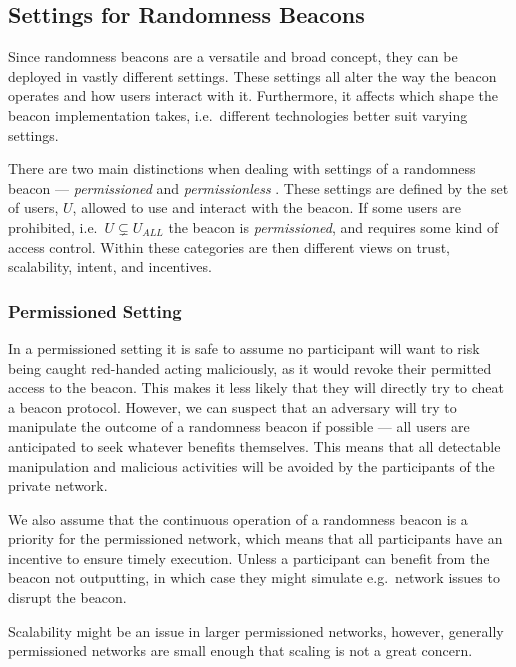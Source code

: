 \subsection{Settings for Randomness Beacons}
Since randomness beacons are a versatile and broad concept, they can be deployed in vastly different settings.
These settings all alter the way the beacon operates and how users interact with it.
Furthermore, it affects which shape the beacon implementation takes, i.e.\ different technologies better suit varying settings.

There are two main distinctions when dealing with settings of a randomness beacon --- \emph{permissioned} and \emph{permissionless} .
These settings are defined by the set of users, $U$, allowed to use and interact with the beacon.
If some users are prohibited, i.e.\ $U \subsetneq U_{ALL}$ the beacon is \emph{permissioned}, and requires some kind of access control.
Within these categories are then different views on trust, scalability, intent, and incentives.

\subsubsection{Permissioned Setting}
In a permissioned setting it is safe to assume no participant will want to risk being caught red-handed acting maliciously, as it would revoke their permitted access to the beacon. This makes it less likely that they will directly try to cheat a beacon protocol.
However, we can suspect that an adversary will try to manipulate the outcome of a randomness beacon if possible --- all users are anticipated to seek whatever benefits themselves.
This means that all detectable manipulation and malicious activities will be avoided by the participants of the private network.

We also assume that the continuous operation of a randomness beacon is a priority for the permissioned network, which means that all participants have an incentive to ensure timely execution.
Unless a participant can benefit from the beacon not outputting, in which case they might simulate e.g.\ network issues to disrupt the beacon.

Scalability might be an issue in larger permissioned networks, however, generally permissioned networks are small enough that scaling is not a great concern.

